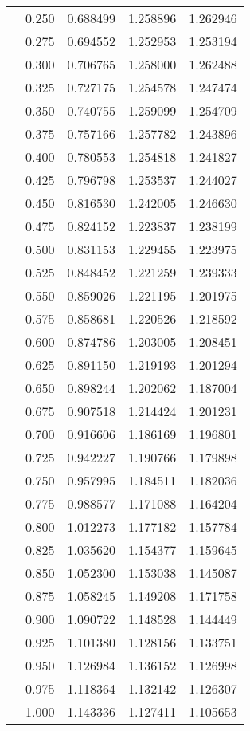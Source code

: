 \begin{tabular}{llrrr}
         & 0.250 &   0.688499 &   1.258896 &   1.262946 \\
         & 0.275 &   0.694552 &   1.252953 &   1.253194 \\
         & 0.300 &   0.706765 &   1.258000 &   1.262488 \\
         & 0.325 &   0.727175 &   1.254578 &   1.247474 \\
         & 0.350 &   0.740755 &   1.259099 &   1.254709 \\
         & 0.375 &   0.757166 &   1.257782 &   1.243896 \\
         & 0.400 &   0.780553 &   1.254818 &   1.241827 \\
         & 0.425 &   0.796798 &   1.253537 &   1.244027 \\
         & 0.450 &   0.816530 &   1.242005 &   1.246630 \\
         & 0.475 &   0.824152 &   1.223837 &   1.238199 \\
         & 0.500 &   0.831153 &   1.229455 &   1.223975 \\
         & 0.525 &   0.848452 &   1.221259 &   1.239333 \\
         & 0.550 &   0.859026 &   1.221195 &   1.201975 \\
         & 0.575 &   0.858681 &   1.220526 &   1.218592 \\
         & 0.600 &   0.874786 &   1.203005 &   1.208451 \\
         & 0.625 &   0.891150 &   1.219193 &   1.201294 \\
         & 0.650 &   0.898244 &   1.202062 &   1.187004 \\
         & 0.675 &   0.907518 &   1.214424 &   1.201231 \\
         & 0.700 &   0.916606 &   1.186169 &   1.196801 \\
         & 0.725 &   0.942227 &   1.190766 &   1.179898 \\
         & 0.750 &   0.957995 &   1.184511 &   1.182036 \\
         & 0.775 &   0.988577 &   1.171088 &   1.164204 \\
         & 0.800 &   1.012273 &   1.177182 &   1.157784 \\
         & 0.825 &   1.035620 &   1.154377 &   1.159645 \\
         & 0.850 &   1.052300 &   1.153038 &   1.145087 \\
         & 0.875 &   1.058245 &   1.149208 &   1.171758 \\
         & 0.900 &   1.090722 &   1.148528 &   1.144449 \\
         & 0.925 &   1.101380 &   1.128156 &   1.133751 \\
         & 0.950 &   1.126984 &   1.136152 &   1.126998 \\
         & 0.975 &   1.118364 &   1.132142 &   1.126307 \\
         & 1.000 &   1.143336 &   1.127411 &   1.105653 \\
\bottomrule
\end{tabular}
